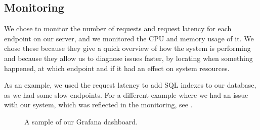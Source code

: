 \subsection{Monitoring}
\label{section:process-monitoring}
We chose to monitor the number of requests and request latency for each endpoint on our server, and we monitored the CPU and memory usage of it. We chose these because they give a quick overview of how the system is performing and because they allow us to diagnose issues faster, by locating when something happened, at which endpoint and if it had an effect on system resources.

As an example, we used the request latency to add SQL indexes to our database, as we had some slow endpoints. For a different example where we had an issue with our system, which was reflected in the monitoring, see .

\begin{figure}[H]
    \caption{A sample of our Grafana dashboard.}
\end{figure}
